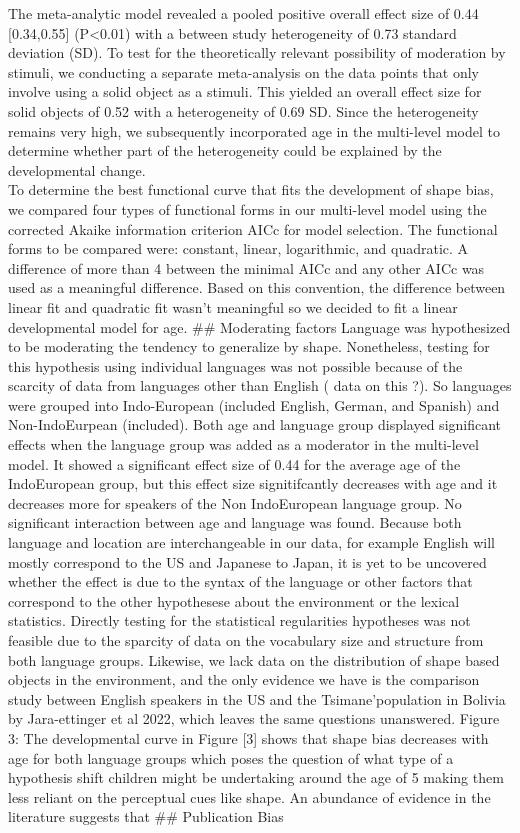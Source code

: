 \documentclass[
  man]{apa6}
\begin{document}
The meta-analytic model revealed a pooled positive overall effect size of 0.44 {[}0.34,0.55{]} (P\textless0.01) with a between study heterogeneity of 0.73 standard deviation (SD). To test for the theoretically relevant possibility of moderation by stimuli, we conducting a separate meta-analysis on the data points that only involve using a solid object as a stimuli. This yielded an overall effect size for solid objects of 0.52 with a heterogeneity of 0.69 SD. Since the heterogeneity remains very high, we subsequently incorporated age in the multi-level model to determine whether part of the heterogeneity could be explained by the developmental change.\\
To determine the best functional curve that fits the development of shape bias, we compared four types of functional forms in our multi-level model using the corrected Akaike information criterion AICc for model selection. The functional forms to be compared were: constant, linear, logarithmic, and quadratic. A difference of more than 4 between the minimal AICc and any other AICc was used as a meaningful difference. Based on this convention, the difference between linear fit and quadratic fit wasn't meaningful so we decided to fit a linear developmental model for age.
\#\# Moderating factors
Language was hypothesized to be moderating the tendency to generalize by shape. Nonetheless, testing for this hypothesis using individual languages was not possible because of the scarcity of data from languages other than English ( data on this ?). So languages were grouped into Indo-European (included English, German, and Spanish) and Non-IndoEurpean (included).
Both age and language group displayed significant effects when the language group was added as a moderator in the multi-level model. It showed a significant effect size of 0.44 for the average age of the IndoEuropean group, but this effect size signitifcantly decreases with age and it decreases more for speakers of the Non IndoEuropean language group. No significant interaction between age and language was found.
Because both language and location are interchangeable in our data, for example English will mostly correspond to the US and Japanese to Japan, it is yet to be uncovered whether the effect is due to the syntax of the language or other factors that correspond to the other hypothesese about the environment or the lexical statistics. Directly testing for the statistical regularities hypotheses was not feasible due to the sparcity of data on the vocabulary size and structure from both language groups. Likewise, we lack data on the distribution of shape based objects in the environment, and the only evidence we have is the comparison study between English speakers in the US and the Tsimane'population in Bolivia by Jara-ettinger et al 2022, which leaves the same questions unanswered.
Figure 3:
The developmental curve in Figure {[}3{]} shows that shape bias decreases with age for both language groups which poses the question of what type of a hypothesis shift children might be undertaking around the age of 5 making them less reliant on the perceptual cues like shape. An abundance of evidence in the literature suggests that
\#\# Publication Bias
\end{document}
